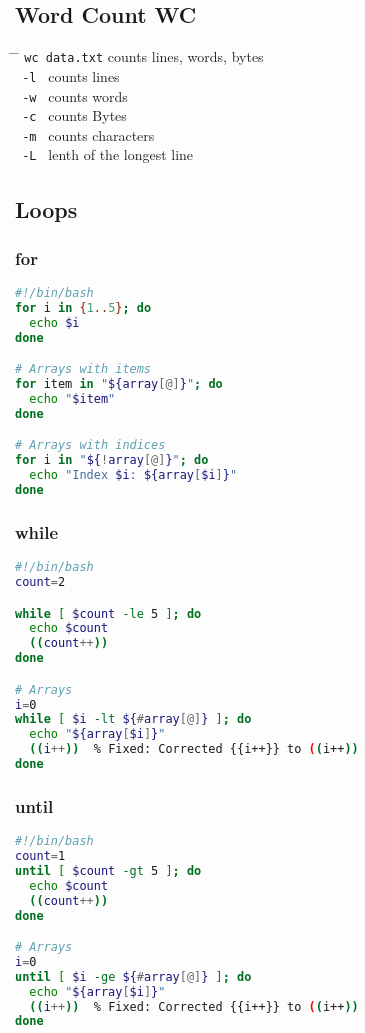 \documentclass[a4paper,10pt]{article}
\begin{document}
\subsection{Word Count WC}
\begin{tabbing}
	\= \hspace{30mm} \= \hspace{50mm} \kill
	\> \verb|wc data.txt| \> counts lines, words, bytes \\
	\> \verb| -l | \> counts lines \\
	\> \verb| -w | \> counts words \\
	\> \verb| -c | \> counts Bytes \\
	\> \verb| -m | \> counts characters \\
	\> \verb| -L | \> lenth of the longest line \\
\end{tabbing}

\subsection{Loops}
\subsubsection*{for}
\begin{lstlisting}[language=bash]
#!/bin/bash
for i in {1..5}; do
  echo $i
done

# Arrays with items
for item in "${array[@]}"; do 
  echo "$item"
done 

# Arrays with indices
for i in "${!array[@]}"; do 
  echo "Index $i: ${array[$i]}"
done
\end{lstlisting}

\subsubsection*{while}
\begin{lstlisting}[language=bash]
#!/bin/bash
count=2

while [ $count -le 5 ]; do
  echo $count
  ((count++))
done

# Arrays
i=0 
while [ $i -lt ${#array[@]} ]; do 
  echo "${array[$i]}"
  ((i++))  % Fixed: Corrected {{i++}} to ((i++))
done
\end{lstlisting}

\subsubsection*{until}
\begin{lstlisting}[language=bash]
#!/bin/bash
count=1
until [ $count -gt 5 ]; do
  echo $count
  ((count++))
done

# Arrays 
i=0 
until [ $i -ge ${#array[@]} ]; do 
  echo "${array[$i]}"
  ((i++))  % Fixed: Corrected {{i++}} to ((i++))
done
\end{lstlisting}
\end{document}
